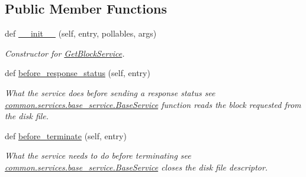 \subsection*{Public Member Functions}
\begin{DoxyCompactItemize}
\item 
def \hyperlink{class_r_a_i_d5_1_1block__device_1_1services_1_1get__block__service_1_1_get_block_service_a6fe680bf73350c7bdb9f97266b6fa6ca}{\+\_\+\+\_\+init\+\_\+\+\_\+} (self, entry, pollables, args)
\begin{DoxyCompactList}\small\item\em Constructor for \hyperlink{class_r_a_i_d5_1_1block__device_1_1services_1_1get__block__service_1_1_get_block_service}{Get\+Block\+Service}. \end{DoxyCompactList}\item 
def \hyperlink{class_r_a_i_d5_1_1block__device_1_1services_1_1get__block__service_1_1_get_block_service_a15bbebfff6a6da5eb532ecb8a94cefa6}{before\+\_\+response\+\_\+status} (self, entry)
\begin{DoxyCompactList}\small\item\em What the service does before sending a response status see \hyperlink{class_r_a_i_d5_1_1common_1_1services_1_1base__service_1_1_base_service}{common.\+services.\+base\+\_\+service.\+Base\+Service} function reads the block requested from the disk file. \end{DoxyCompactList}\item 
\mbox{\label{class_r_a_i_d5_1_1block__device_1_1services_1_1get__block__service_1_1_get_block_service_a287839bc5348ebbf7e959b10f27c1930}} 
def \hyperlink{class_r_a_i_d5_1_1block__device_1_1services_1_1get__block__service_1_1_get_block_service_a287839bc5348ebbf7e959b10f27c1930}{before\+\_\+terminate} (self, entry)
\begin{DoxyCompactList}\small\item\em What the service needs to do before terminating see \hyperlink{class_r_a_i_d5_1_1common_1_1services_1_1base__service_1_1_base_service}{common.\+services.\+base\+\_\+service.\+Base\+Service} closes the disk file descriptor. \end{DoxyCompactList}\end{DoxyCompactItemize}
